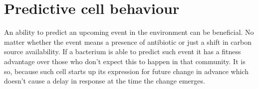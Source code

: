 




\section{Predictive cell behaviour}
An ability to predict an upcoming event in the environment can be beneficial.
No matter whether the event means a presence of antibiotic or just a shift in carbon source availability.
If a bacterium is able to predict such event it has a fitness advantage over those who don't expect this to happen in that community.
It is so, because such cell starts up its expression for future change in advance which doesn't cause a delay in response at the time the change emerges.

